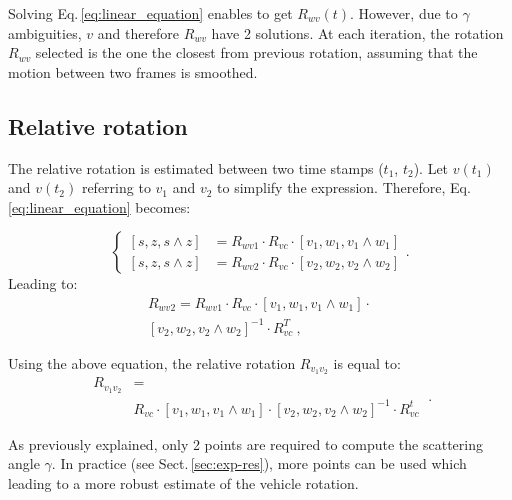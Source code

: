 Solving Eq.\,\eqref{eq:linear_equation} enables to get $R_{wv}(t)$. However, due to
$\gamma$ ambiguities, $v$ and therefore $R_{wv}$ have 2 solutions. At each
iteration, the rotation $R_{wv}$ selected is the one the closest from previous
rotation, assuming that the motion between two frames is smoothed.

\subsection{Relative rotation}
\label{sec:rel-rot}

The relative rotation is estimated between two time stamps ($t_1$,
$t_2$). Let $v(t_1)$ and $v(t_2)$ referring to $v_1$ and $v_2$ to simplify the
expression. Therefore, Eq.\,\eqref{eq:linear_equation} becomes:

\begin{equation}
\begin{cases}
\left[s,z,s\wedge z\right] & =R_{wv1}\cdot R_{vc}\cdot\left[v_{1},w_{1},v_{1}\wedge w_{1}\right]\\
\left[s,z,s\wedge z\right] & =R_{wv2}\cdot R_{vc}\cdot\left[v_{2},w_{2},v_{2}\wedge w_{2}\right]
\end{cases}.
\label{eq:rel-linear_equation}
\end{equation}
Leading to:
\begin{equation}
  \begin{split}
R_{wv2}=R_{wv1}\cdot R_{vc}\cdot\left[v_{1},w_{1},v_{1}\wedge
  w_{1}\right]\cdot \\
\left[v_{2},w_{2},v_{2}\wedge w_{2}\right]^{-1} \cdot R_{vc}^{T} \ ,
\label{eq:relative_equation}\end{split}
\end{equation}

Using the above equation, the relative rotation $R_{v_{1}v_{2}}$ is equal to:
\begin{equation}
\begin{split}
  R_{v_{1}v_{2}} &= \\
   & R_{vc}\cdot\left[v_{1},w_{1},v_{1}\wedge
  w_{1}\right]\cdot\left[v_{2},w_{2},v_{2}\wedge w_{2}\right]^{-1}\cdot
R_{vc}^{t}
\end{split} \ .
\label{eq:final-relative}
\end{equation}

As previously explained, only 2 points are required to compute the scattering
angle $\gamma$. In practice (see Sect.\,\ref{sec:exp-res}), more points can be
used which leading to a more robust estimate of the vehicle rotation.

